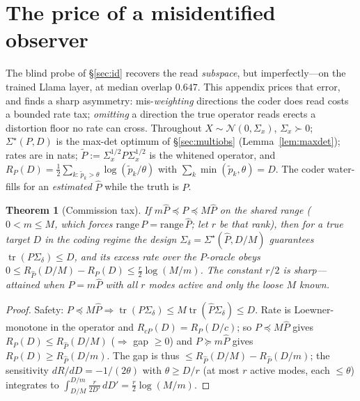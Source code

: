 \documentclass[11pt]{article}
\newtheorem{theorem}{Theorem}
\theoremstyle{definition}
\theoremstyle{remark}
\newcommand{\tr}{\operatorname{tr}}
\begin{document}
\section{The price of a misidentified observer}\label{app:mismatch}

The blind probe of \S\ref{sec:id} recovers the read \emph{subspace}, but imperfectly---on
the trained Llama layer, at median overlap $0.647$. This appendix prices that error, and
finds a sharp asymmetry: mis-\emph{weighting} directions the coder does read costs a
bounded rate tax; \emph{omitting} a direction the true operator reads erects a distortion
floor no rate can cross. Throughout $X\sim\mathcal N(0,\Sigma_x)$, $\Sigma_x\succ0$;
$\Sigma^\star(P,D)$ is the max-det optimum of \S\ref{sec:multiobs}
(Lemma~\ref{lem:maxdet}); rates are in nats; $\tilde P:=\Sigma_x^{1/2}P\Sigma_x^{1/2}$ is
the whitened operator, and $R_P(D)=\tfrac12\sum_{k:\,\tilde p_k>\theta}\log(\tilde
p_k/\theta)$ with $\sum_k\min(\tilde p_k,\theta)=D$. The coder water-fills for an
\emph{estimated} $\hat P$ while the truth is $P$.

\begin{theorem}[Commission tax]\label{thm:commission}
If $m\hat P\preceq P\preceq M\hat P$ on the shared range ($0<m\le M$, which forces
$\mathrm{range}\,P=\mathrm{range}\,\hat P$; let $r$ be that rank), then for a true target
$D$ in the coding regime the design $\Sigma_\delta=\Sigma^\star(\hat P,D/M)$ guarantees
$\tr(P\Sigma_\delta)\le D$, and its excess rate over the $P$-oracle obeys $0\le R_{\hat
P}(D/M)-R_P(D)\le\tfrac r2\log(M/m)$. The constant $r/2$ is sharp---attained when
$P=m\hat P$ with all $r$ modes active and only the loose $M$ known.
\end{theorem}
\begin{proof}
Safety: $P\preceq M\hat P\Rightarrow\tr(P\Sigma_\delta)\le M\tr(\hat P\Sigma_\delta)\le D$.
Rate is Loewner-monotone in the operator and $R_{cP}(D)=R_P(D/c)$; so $P\preceq M\hat P$
gives $R_P(D)\le R_{\hat P}(D/M)$ ($\Rightarrow$ gap $\ge0$) and $P\succeq m\hat P$ gives
$R_P(D)\ge R_{\hat P}(D/m)$. The gap is thus $\le R_{\hat P}(D/M)-R_{\hat P}(D/m)$; the
sensitivity $dR/dD=-1/(2\theta)$ with $\theta\ge D/r$ (at most $r$ active modes, each
$\le\theta$) integrates to $\int_{D/M}^{D/m}\tfrac{r}{2D'}\,dD'=\tfrac r2\log(M/m)$.
\end{proof}
\end{document}
